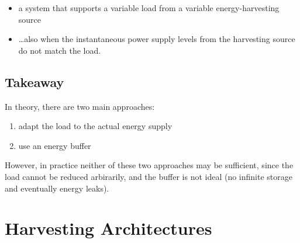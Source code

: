 \begin{definition}

   \begin{itemize}
      \item a system that supports a variable load from a variable energy-harvesting source
      \item \dots also when the instantaneous power supply levels from the harvesting source do not match the load.
   \end{itemize}
\end{definition}

\subsection{Takeaway}
In theory, there are two main approaches:
\begin{enumerate}
   \item adapt the load to the actual energy supply
   \item use an energy buffer
\end{enumerate}

However, in practice neither of these two approaches may be sufficient, since the load cannot be reduced arbirarily, and the buffer is not ideal (no infinite storage and eventually energy leaks).
\newpage
\section{Harvesting Architectures}
